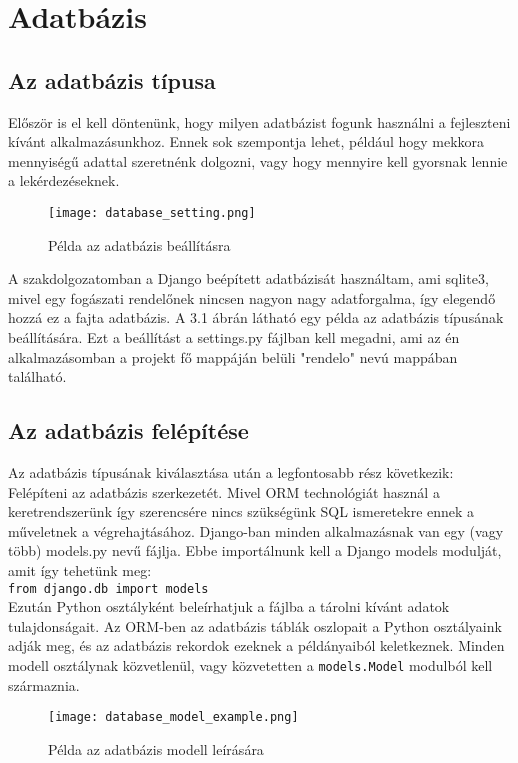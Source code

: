 \chapter{Adatbázis}
\label{chap:fejezet3}

\section{Az adatbázis típusa}
Először is el kell döntenünk, hogy milyen adatbázist fogunk használni a fejleszteni kívánt alkalmazásunkhoz. Ennek sok szempontja lehet, például hogy mekkora mennyiségű adattal szeretnénk dolgozni, vagy hogy mennyire kell gyorsnak lennie a lekérdezéseknek.

\begin{figure}[H]
	\caption{Példa az adatbázis beállításra}
	\label{fig:adatbazisbeallitas}
	\centering
	\texttt{[image: database\_setting.png]}
\end{figure}

A szakdolgozatomban a Django beépített adatbázisát használtam, ami sqlite3, mivel egy fogászati rendelőnek nincsen nagyon nagy adatforgalma, így elegendő hozzá ez a fajta adatbázis. A 3.1 ábrán látható egy példa az adatbázis típusának beállítására. Ezt a beállítást a settings.py fájlban kell megadni, ami az én alkalmazásomban a projekt fő mappáján belüli "rendelo" nevú mappában található.

\section{Az adatbázis felépítése}
Az adatbázis típusának kiválasztása után a legfontosabb rész következik: Felépíteni az adatbázis szerkezetét. Mivel ORM technológiát használ a keretrendszerünk így szerencsére nincs szükségünk SQL ismeretekre ennek a műveletnek a végrehajtásához. Django-ban minden alkalmazásnak van egy (vagy több) models.py nevű fájlja. Ebbe importálnunk kell a Django models modulját, amit így tehetünk meg:\\
\texttt{from django.db import models}
\\
Ezután Python osztályként beleírhatjuk a fájlba a tárolni kívánt adatok tulajdonságait. Az ORM-ben az adatbázis táblák oszlopait a Python osztályaink adják meg, és az adatbázis rekordok ezeknek a példányaiból keletkeznek. Minden modell osztálynak közvetlenül, vagy közvetetten a \texttt{models.Model} modulból kell származnia.

\begin{figure}[H]
	\caption{Példa az adatbázis modell leírására}
	\label{fig:adatbazismodell}
	\centering
	\texttt{[image: database\_model\_example.png]}
\end{figure}

